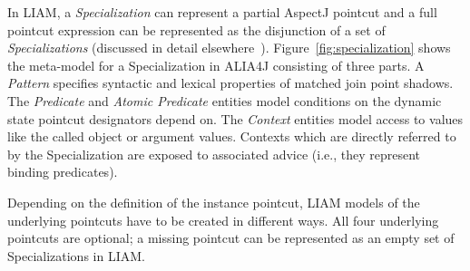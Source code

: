In LIAM, a \emph{Specialization} can represent a partial AspectJ pointcut and a full pointcut expression can be represented as the disjunction of a set of \emph{Specializations} (discussed in detail elsewhere~\cite{Bockisch2007}). 
Figure~\ref{fig:specialization} shows the meta-model for a Specialization in ALIA4J consisting of three parts.
A \emph{Pattern} specifies syntactic and lexical properties of matched join point shadows.
The \emph{Predicate} and \emph{Atomic Predicate} entities model conditions on the dynamic state pointcut designators depend on.
The \emph{Context} entities model access to values like the called object or argument values.
Contexts which are directly referred to by the Specialization are exposed to associated advice (i.e., they represent binding predicates).

Depending on the definition of the instance pointcut, LIAM models of the underlying pointcuts have to be created in different ways.
All four underlying pointcuts are optional; a missing pointcut can be represented as an empty set of Specializations in LIAM.


